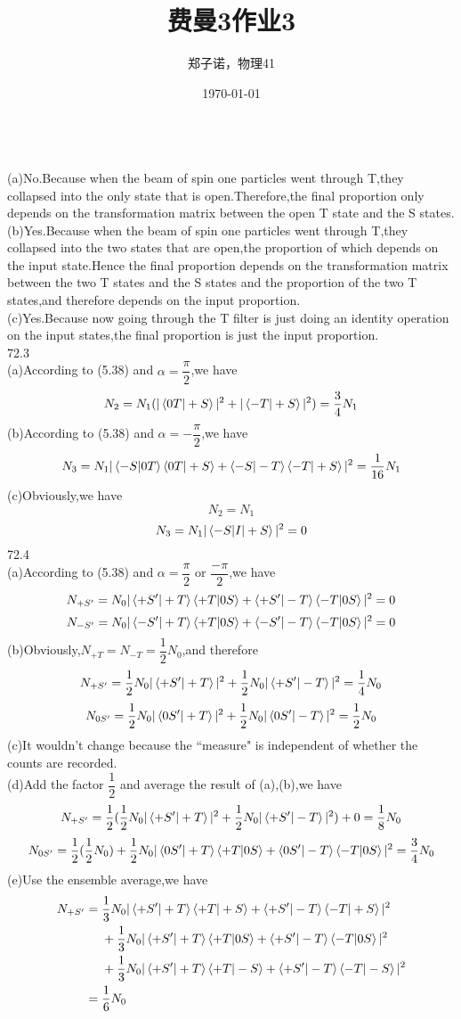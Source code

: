 \documentclass[utf8]{ctexart}
\title{费曼3作业3}
\author{郑子诺，物理41}
\date{\today}
\begin{document}
\maketitle
{}\\
(a)No.Because when the beam of spin one particles went through T,they collapsed into the only state that is open.Therefore,the final proportion only depends on the transformation matrix between the open T state and the S states.\\
(b)Yes.Because when the beam of spin one particles went through T,they collapsed into the two states that are open,the proportion of which depends on the input state.Hence the final proportion depends on the transformation matrix between the two T states and the S states and the proportion of the two T states,and therefore depends on the input proportion.\\
(c)Yes.Because now going through the T filter is just doing an identity operation on the input states,the final proportion is just the input proportion.\\
72.3\\
(a)According to (5.38) and $\alpha=\dfrac{\pi}{2}$,we have
\[
N_2=N_1(|\braket{0T|+S}|^2+|\braket{-T|+S}|^2)=\frac{3}{4}N_1
\]
(b)According to (5.38) and $\alpha=-\dfrac{\pi}{2}$,we have
\[
N_3=N_1|\braket{-S|0T}\braket{0T|+S}+\braket{-S|-T}\braket{-T|+S}|^2=\frac{1}{16}N_1
\]
(c)Obviously,we have
\[N_2=N_1\]
\[N_3=N_1|\braket{-S|I|+S}|^2=0\]
72.4\\
(a)According to (5.38) and $\alpha=\dfrac{\pi}{2}$ or $\dfrac{-\pi}{2}$,we have
\[
N_{+S'}=N_0|\braket{+S'|+T}\braket{+T|0S}+\braket{+S'|-T}\braket{-T|0S}|^2=0
\]
\[
N_{-S'}=N_0|\braket{-S'|+T}\braket{+T|0S}+\braket{-S'|-T}\braket{-T|0S}|^2=0
\]
(b)Obviously,$N_{+T}=N_{-T}=\dfrac{1}{2}N_0$,and therefore
\[
N_{+S'}=\frac{1}{2}N_0|\braket{+S'|+T}|^2+\frac{1}{2}N_0|\braket{+S'|-T}|^2=\frac{1}{4}N_0
\]
\[
N_{0S'}=\frac{1}{2}N_0|\braket{0S'|+T}|^2+\frac{1}{2}N_0|\braket{0S'|-T}|^2=\frac{1}{2}N_0
\]
(c)It wouldn't change because the ``measure" is independent of whether the counts are recorded.\\
(d)Add the factor $\dfrac{1}{2}$ and average the result of (a),(b),we have
\[
N_{+S'}=\frac{1}{2}(\frac{1}{2}N_0|\braket{+S'|+T}|^2+\frac{1}{2}N_0|\braket{+S'|-T}|^2)+0=\frac{1}{8}N_0
\]
\[
N_{0S'}=\frac{1}{2}(\frac{1}{2}N_0)+\frac{1}{2}N_0|\braket{0S'|+T}\braket{+T|0S}+\braket{0S'|-T}\braket{-T|0S}|^2=\frac{3}{4}N_0
\]
(e)Use the ensemble average,we have
\begin{align}
	N_{+S'}={}&\frac{1}{3}N_0|\braket{+S'|+T}\braket{+T|+S}+\braket{+S'|-T}\braket{-T|+S}|^2\notag\\
	&+\frac{1}{3}N_0|\braket{+S'|+T}\braket{+T|0S}+\braket{+S'|-T}\braket{-T|0S}|^2\notag\\
	&+\frac{1}{3}N_0|\braket{+S'|+T}\braket{+T|-S}+\braket{+S'|-T}\braket{-T|-S}|^2\notag\\
	={}&\frac{1}{6}N_0\notag
\end{align}
\end{document}

